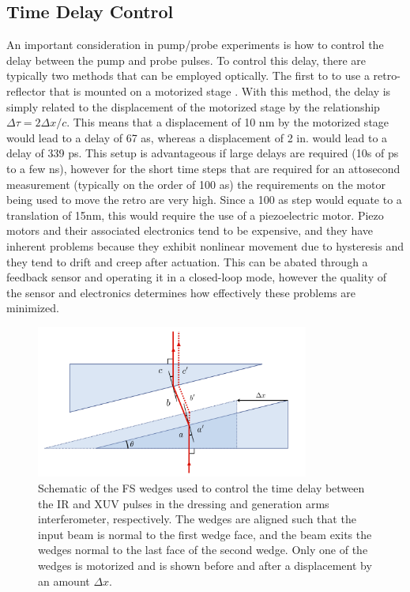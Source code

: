 \subsection{Time Delay Control}
\label{sec:delay_wedges}

An important consideration in pump/probe experiments is how to control the delay between the pump and probe pulses.  To control this delay, there are typically two methods that can be employed optically.  The first to to use a retro-reflector that is mounted on a motorized stage \cite{jagerAttosecondTransientAbsorption2018, jagerAttosecondTransientAbsorption2017, bellTransientAbsorptionSpectroscopy2013, jiangChargeCarrierDynamics2015, borjaElectronDynamicsSolids2016, chengAttoseondTransientAbsorption2015}.  With this method, the delay is simply related to the displacement of the motorized stage by the relationship $\Delta\tau = 2\Delta x/c$.  This means that a displacement of 10 nm by the motorized stage would lead to a delay of 67 as, whereas a displacement of 2 in. would lead to a delay of 339 ps. This setup is advantageous if large delays are required (10s of ps to a few ns), however for the short time steps that are required for an attosecond measurement (typically on the order of 100 as) the requirements on the motor being used to move the retro are very high.  Since a 100 as step would equate to a translation of 15nm, this would require the use of a piezoelectric motor.  Piezo motors and their associated electronics tend to be expensive, and they have inherent problems because they exhibit nonlinear movement due to hysteresis and they tend to drift and creep after actuation.  This can be abated through a feedback sensor and operating it in a closed-loop mode, however the quality of the sensor and electronics determines how effectively these problems are minimized.

\begin{figure}
	\centering
	\includegraphics[width=0.8\textwidth]{figures/Beamline/wedge_calibration.pdf}
	\caption{Schematic of the FS wedges used to control the time delay between the IR and XUV pulses in the dressing and generation arms interferometer, respectively. The wedges are aligned such that the input beam is normal to the first wedge face, and the beam exits the wedges normal to the last face of the second wedge.  Only one of the wedges is motorized and is shown before and after a displacement by an amount $\Delta x$.}
	\label{fig:wedges}
\end{figure}

